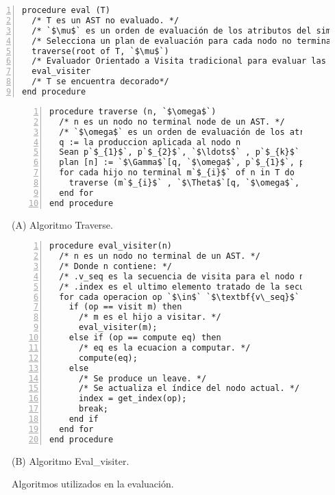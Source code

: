 \documentclass[runningheads,a4paper]{llncs}
\begin{document}
\begin{lstlisting}[numbers=left]
procedure eval (T)
  /* T es un AST no evaluado. */
  /* `$\mu$` es un orden de evaluación de los atributos del simbolo inicial. */
  /* Selecciona un plan de evaluación para cada nodo no terminal en T. */
  traverse(root of T, `$\mu$`)
  /* Evaluador Orientado a Visita tradicional para evaluar las instancias de atributos de T.*/
  eval_visiter 
  /* T se encuentra decorado*/
end procedure
\end{lstlisting}

\begin{figure}
\vspace{-0.5cm}
\begin{minipage}{0.45\textwidth}
\begin{center}
\begin{lstlisting}[numbers=left]
procedure traverse (n, `$\omega$`)
  /* n es un nodo no terminal node de un AST. */
  /* `$\omega$` es un orden de evaluación de los atributos del simbolo no terminal de mas a izquierda localizado en n.*/
  q := la produccion aplicada al nodo n
  Sean p`$_{1}$`, p`$_{2}$`, `$\ldots$` , p`$_{k}$` las producciones aplicadas a los nodos hijos no terminales de n.
  plan [n] := `$\Gamma$`[q, `$\omega$`, p`$_{1}$`, p`$_{2}$`, `$\ldots$` , p`$_{k}$`]
  for cada hijo no terminal m`$_{i}$` of n in T do
    traverse (m`$_{i}$` , `$\Theta$`[q, `$\omega$`, i, p`$_{1}$`, p`$_{2}$`, `$\ldots$` , p`$_{k}$`])
  end for
end procedure
\end{lstlisting}
(A) Algoritmo Traverse.
\end{center}
\end{minipage}
\hspace{0.6cm}\begin{minipage}{0.45\textwidth}
\begin{center}
\begin{lstlisting}[numbers=left]
procedure eval_visiter(n)
  /* n es un nodo no terminal de un AST. */
  /* Donde n contiene: */
  /* .v_seq es la secuencia de visita para el nodo n. */
  /* .index es el ultimo elemento tratado de la secuencia. */
  for cada operacion op `$\in$` `$\textbf{v\_seq}$` mayor a `$\textbf{index}$` do
    if (op == visit m) then
      /* m es el hijo a visitar. */
      eval_visiter(m);
    else if (op == compute eq) then
      /* eq es la ecuacion a computar. */
      compute(eq);
    else
      /* Se produce un leave. */
      /* Se actualiza el índice del nodo actual. */
      index = get_index(op);
      break;
    end if
  end for
end procedure
\end{lstlisting}
(B) Algoritmo Eval\_visiter.
\end{center}
\end{minipage}
\vspace{-0.22cm}
\caption{\label{fig:algotrayenva}Algoritmos utilizados en la evaluación.}
\vspace{-0.7cm}
\end{figure}
\end{document}
